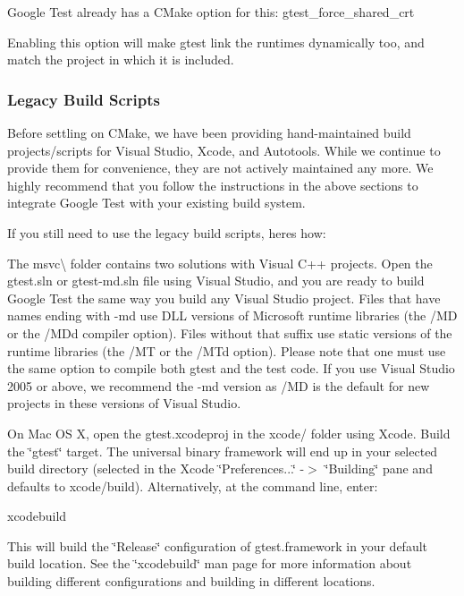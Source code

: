 Google Test already has a C\+Make option for this\+: {\ttfamily gtest\+\_\+force\+\_\+shared\+\_\+crt}

Enabling this option will make gtest link the runtimes dynamically too, and match the project in which it is included.

\subsubsection*{Legacy Build Scripts}

Before settling on C\+Make, we have been providing hand-\/maintained build projects/scripts for Visual Studio, Xcode, and Autotools. While we continue to provide them for convenience, they are not actively maintained any more. We highly recommend that you follow the instructions in the above sections to integrate Google Test with your existing build system.

If you still need to use the legacy build scripts, here\textquotesingle{}s how\+:

The msvc\textbackslash{} folder contains two solutions with Visual C++ projects. Open the {\ttfamily gtest.\+sln} or {\ttfamily gtest-\/md.\+sln} file using Visual Studio, and you are ready to build Google Test the same way you build any Visual Studio project. Files that have names ending with -\/md use D\+LL versions of Microsoft runtime libraries (the /\+MD or the /\+M\+Dd compiler option). Files without that suffix use static versions of the runtime libraries (the /\+MT or the /\+M\+Td option). Please note that one must use the same option to compile both gtest and the test code. If you use Visual Studio 2005 or above, we recommend the -\/md version as /\+MD is the default for new projects in these versions of Visual Studio.

On Mac OS X, open the {\ttfamily gtest.\+xcodeproj} in the {\ttfamily xcode/} folder using Xcode. Build the \char`\"{}gtest\char`\"{} target. The universal binary framework will end up in your selected build directory (selected in the Xcode \char`\"{}\+Preferences...\char`\"{} -\/$>$ \char`\"{}\+Building\char`\"{} pane and defaults to xcode/build). Alternatively, at the command line, enter\+: \begin{DoxyVerb}xcodebuild
\end{DoxyVerb}


This will build the \char`\"{}\+Release\char`\"{} configuration of gtest.\+framework in your default build location. See the \char`\"{}xcodebuild\char`\"{} man page for more information about building different configurations and building in different locations.

